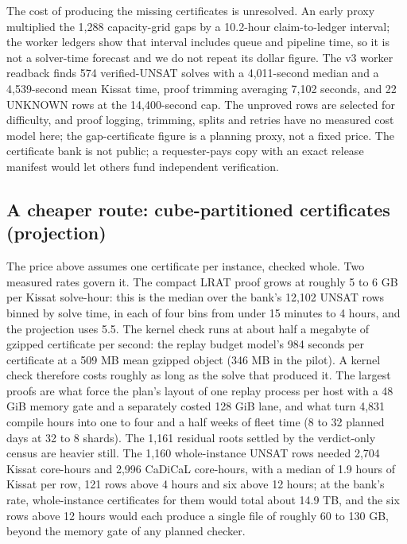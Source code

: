 \documentclass{anvil-paper}
\theoremstyle{definition}
\begin{document}
The cost of producing the missing certificates is unresolved. An early proxy multiplied the 1,288 capacity-grid gaps by a 10.2-hour claim-to-ledger interval; the worker ledgers show that interval includes queue and pipeline time, so it is not a solver-time forecast and we do not repeat its dollar figure. The v3 worker readback finds 574 verified-UNSAT solves with a 4,011-second median and a 4,539-second mean Kissat time, proof trimming averaging 7,102 seconds, and 22 UNKNOWN rows at the 14,400-second cap. The unproved rows are selected for difficulty, and proof logging, trimming, splits and retries have no measured cost model here; the gap-certificate figure is a planning proxy, not a fixed price. The certificate bank is not public; a requester-pays copy with an exact release manifest would let others fund independent verification.

\subsection{A cheaper route: cube-partitioned certificates (projection)}\label{sec:cube}

The price above assumes one certificate per instance, checked whole. Two measured rates govern it. The compact LRAT proof grows at roughly 5 to 6 GB per Kissat solve-hour: this is the median over the bank's 12,102 UNSAT rows binned by solve time, in each of four bins from under 15 minutes to 4 hours, and the projection uses 5.5. The kernel check runs at about half a megabyte of gzipped certificate per second: the replay budget model's 984 seconds per certificate at a 509 MB mean gzipped object (346 MB in the pilot). A kernel check therefore costs roughly as long as the solve that produced it. The largest proofs are what force the plan's layout of one replay process per host with a 48 GiB memory gate and a separately costed 128 GiB lane, and what turn 4,831 compile hours into one to four and a half weeks of fleet time (8 to 32 planned days at 32 to 8 shards). The 1,161 residual roots settled by the verdict-only census are heavier still. The 1,160 whole-instance UNSAT rows needed 2,704 Kissat core-hours and 2,996 CaDiCaL core-hours, with a median of 1.9 hours of Kissat per row, 121 rows above 4 hours and six above 12 hours; at the bank's rate, whole-instance certificates for them would total about 14.9 TB, and the six rows above 12 hours would each produce a single file of roughly 60 to 130 GB, beyond the memory gate of any planned checker.
\end{document}
